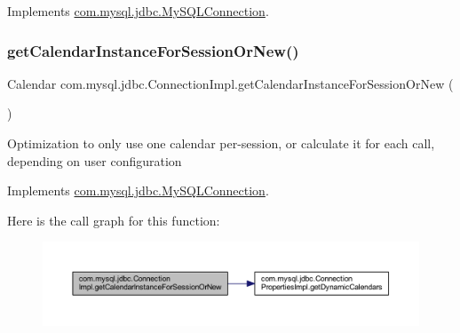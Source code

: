 Implements \mbox{\hyperlink{interfacecom_1_1mysql_1_1jdbc_1_1_my_s_q_l_connection}{com.\+mysql.\+jdbc.\+My\+S\+Q\+L\+Connection}}.

\mbox{\label{classcom_1_1mysql_1_1jdbc_1_1_connection_impl_a0204e16a1a1df5ba25789dcf5e4d9fd0}} 
\subsubsection{\texorpdfstring{get\+Calendar\+Instance\+For\+Session\+Or\+New()}{getCalendarInstanceForSessionOrNew()}}
{\footnotesize\ttfamily Calendar com.\+mysql.\+jdbc.\+Connection\+Impl.\+get\+Calendar\+Instance\+For\+Session\+Or\+New (\begin{DoxyParamCaption}{ }\end{DoxyParamCaption})}

Optimization to only use one calendar per-\/session, or calculate it for each call, depending on user configuration 

Implements \mbox{\hyperlink{interfacecom_1_1mysql_1_1jdbc_1_1_my_s_q_l_connection}{com.\+mysql.\+jdbc.\+My\+S\+Q\+L\+Connection}}.

Here is the call graph for this function\+:\nopagebreak
\begin{figure}[H]
\begin{center}
\leavevmode
\includegraphics[width=350pt]{classcom_1_1mysql_1_1jdbc_1_1_connection_impl_a0204e16a1a1df5ba25789dcf5e4d9fd0_cgraph}
\end{center}
\end{figure}
\mbox{\label{classcom_1_1mysql_1_1jdbc_1_1_connection_impl_a200118367aa1d33fe239bc8dcf5457dd}} 
